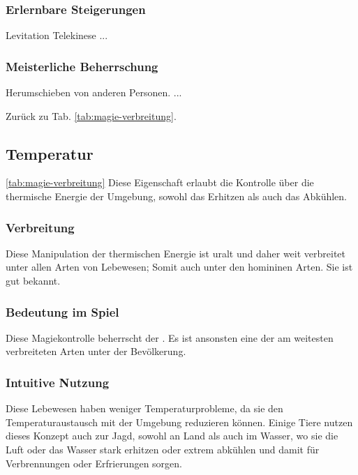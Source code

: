 \subsubsection{Erlernbare Steigerungen}
\begin{outline}
	\1 Levitation
	\1 Telekinese
	\1 ...
\end{outline}

\subsubsection{Meisterliche Beherrschung} 
\begin{outline}
	\1 Herumschieben von anderen Personen.
	\1 ...
\end{outline}
Zurück zu Tab. \ref{tab:magie-verbreitung}.



\subsection{Temperatur}\label{sec:temperaturmagie} \ref{tab:magie-verbreitung}
Diese Eigenschaft erlaubt die Kontrolle über die thermische Energie der Umgebung, sowohl das Erhitzen als auch das Abkühlen.

\subsubsection{Verbreitung}
Diese Manipulation der thermischen Energie ist uralt und daher weit verbreitet unter allen Arten von Lebewesen; Somit auch unter den homininen Arten. 
Sie ist gut bekannt.

\subsubsection{Bedeutung im Spiel}
Diese Magiekontrolle beherrscht der . Es ist ansonsten eine der am weitesten verbreiteten Arten unter der Bevölkerung.

\subsubsection{Intuitive Nutzung}
Diese Lebewesen haben weniger Temperaturprobleme, da sie den Temperaturaustausch mit der Umgebung reduzieren können.
Einige Tiere nutzen dieses Konzept auch zur Jagd, sowohl an Land als auch im Wasser, wo sie die Luft oder das Wasser stark erhitzen oder extrem abkühlen und damit für Verbrennungen oder Erfrierungen sorgen.

